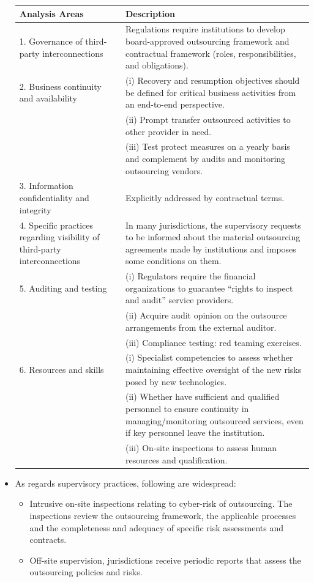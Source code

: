 \begin{itemize}
\begin{table}[H]
        \begin{tabular}{|p{4cm}|p{14cm}|}
            \hline
            \textbf{Analysis Areas} & \textbf{Description} \\ \hline
            1. Governance of third-party interconnections & Regulations require institutions to develop board-approved outsourcing framework and contractual framework (roles, responsibilities, and obligations). \\ \hline
            2. Business continuity and availability & (i) Recovery and resumption objectives should be defined for critical business activities from an end-to-end perspective.\\& (ii) Prompt transfer outsourced activities to other provider in need. \\&(iii) Test protect measures on a yearly basis and complement by audits and monitoring outsourcing vendors. \\ \hline
            3. Information confidentiality and integrity & Explicitly addressed by contractual terms. \\ \hline
            4. Specific practices regarding visibility of third-party interconnections & In many jurisdictions, the supervisory requests to be informed about the material outsourcing agreements made by institutions and imposes some conditions on them. \\ \hline
            5. Auditing and testing & (i) Regulators require the financial organizations to guarantee “rights to inspect and audit” service providers. \\&(ii) Acquire audit opinion on the outsource arrangements from the external auditor. \\&(iii) Compliance testing: red teaming exercises. \\ \hline
            6. Resources and skills & (i) Specialist competencies to assess whether maintaining effective oversight of the new risks posed by new technologies. \\&(ii) Whether have sufficient and qualified personnel to ensure continuity in managing/monitoring outsourced services, even if key personnel leave the institution.\\& (iii) On-site inspections to assess human resources and qualification. \\ \hline
        \end{tabular}
    \end{table}



\item As regards supervisory practices, following are widespread:
    \begin{itemize}
    \item Intrusive on-site inspections relating to cyber-risk of outsourcing. The inspections review the outsourcing framework, the applicable processes and the completeness and adequacy of specific risk assessments and contracts.
    \item Off-site supervision, jurisdictions receive periodic reports that assess the outsourcing policies and risks.
    
    \end{itemize}
\end{itemize}
